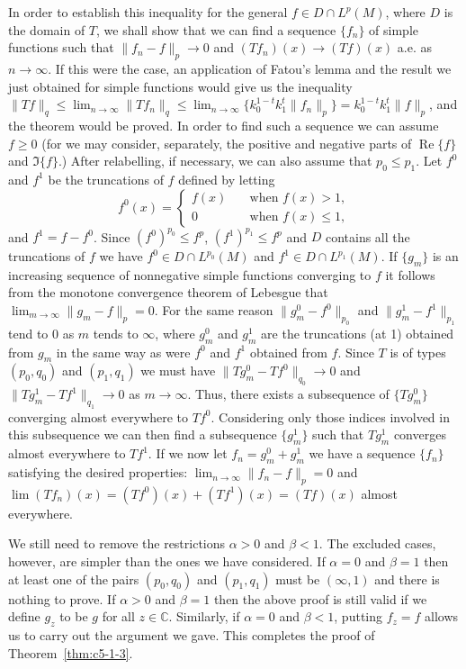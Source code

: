In order to establish this inequality for the general
$f \in D \cap L^{p}(M)$, where $D$ is the domain of $T$, we shall show that we
can find a sequence $\{f_{n}\}$ of simple functions such that
$\|f_{n} - f\|_{p} \to 0$ and $(Tf_{n})(x) \to (Tf)(x)$ a.e. as $n \to \infty$.
If this were the case, an application of Fatou's lemma and the result we just
obtained for simple functions would give us the inequality
$\|Tf\|_{q} \leq \lim_{n \to \infty}\|Tf_{n}\|_{q} \leq \lim_{n \to \infty}\{k_{0}^{1-t}k_{1}^{t}\|f_{n}\|_{p}\} = k_{0}^{1-t}k_{1}^{t}\|f\|_{p}$,
and the theorem would be proved. In order to find such a sequence we can assume
$f \geq 0$ (for we may consider, separately, the positive and negative parts of
$\operatorname{Re}\{f\}$ and $\Im\{f\}$.) After relabelling, if necessary, we
can also assume that $p_{0} \leq p_{1}$. Let $f^{0}$ and $f^{1}$ be the
truncations of $f$ defined by letting
\[
f^{0}(x)=\begin{cases}
f(x) & \quad\text{when } f(x) > 1,\\
0 & \quad\text{when } f(x) \leq 1,
\end{cases}
\]
and $f^{1} = f - f^{0}$. Since $(f^{0})^{p_{0}} \leq f^{p}$,
$(f^{1})^{p_{1}} \leq f^{p}$ and $D$ contains all the truncations of $f$ we
have $f^{0} \in D \cap L^{p_{0}}(M)$ and $f^{1} \in D \cap L^{p_{1}}(M)$. If
$\{g_{m}\}$ is an increasing sequence of nonnegative simple functions
converging to $f$ it follows from the monotone convergence theorem of Lebesgue
that $\lim_{m \to \infty}\|g_{m} - f\|_{p} = 0$. For the same reason
$\|g_{m}^{0} - f^{0}\|_{p_{0}}$ and $\|g_{m}^{1} - f^{1}\|_{p_{1}}$ tend to 0
as $m$ tends to $\infty$, where $g_{m}^{0}$ and $g_{m}^{1}$ are the truncations
(at 1) obtained from $g_{m}$ in the same way as were $f^{0}$ and $f^{1}$
obtained from $f$. Since $T$ is of types $(p_{0}, q_{0})$ and $(p_{1}, q_{1})$
we must have $\|Tg_{m}^{0} - Tf^{0}\|_{q_{0}} \to 0$ and
$\|Tg_{m}^{1} - Tf^{1}\|_{q_{1}} \to 0$ as $m \to \infty$. Thus, there exists a
subsequence of $\{Tg_{m}^{0}\}$ converging almost everywhere to $Tf^{0}$.
Considering only those indices involved in this subsequence we can then find a
subsequence $\{g_{m}^{1}\}$ such that $Tg_{m}^{1}$ converges almost everywhere
to $Tf^{1}$. If we now let $f_{n} = g_{m}^{0} + g_{m}^{1}$ we have a sequence
$\{f_{n}\}$ satisfying the desired properties:
$\lim_{n \to \infty}\|f_{n} - f\|_{p} = 0$ and
$\lim(Tf_{n})(x) = (Tf^{0})(x) + (Tf^{1})(x) = (Tf)(x)$ almost everywhere.

We still need to remove the restrictions $\alpha > 0$ and $\beta < 1$. The
excluded cases, however, are simpler than the ones we have considered. If
$\alpha = 0$ and $\beta = 1$ then at least one of the pairs $(p_{0}, q_{0})$
and $(p_{1}, q_{1})$ must be $(\infty, 1)$ and there is nothing to prove. If
$\alpha > 0$ and $\beta = 1$ then the above proof is still valid if we define
$g_{z}$ to be $g$ for all $z \in \mathbb{C}$. Similarly, if $\alpha = 0$ and
$\beta < 1$, putting $f_{z} = f$ allows us to carry out the argument we gave.
This completes the proof of Theorem~\ref{thm:c5-1-3}.

